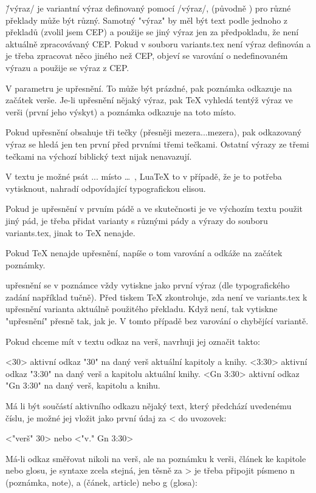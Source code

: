 \v/výraz/ je variantní výraz definovaný pomocí \vdef /výraz/, (původně \vardef)
pro různé překlady může být různý. Samotný "výraz" by měl být text podle
jednoho z překladů (zvolil jsem CEP) a použije se jiný výraz jen za
předpokladu, že není aktuálně zpracovávaný CEP. Pokud v souboru
variants.tex není výraz definován a je třeba zpracovat něco jiného než CEP,
objeví se varování o nedefinovaném výrazu a použije se výraz z CEP.

V parametru \Note je {upřesnění}. To může být prázdné, pak poznámka odkazuje
na začátek verše. Je-li {upřesnění} nějaký výraz, pak TeX vyhledá tentýž
výraz ve verši (první jeho výskyt) a poznámka odkazuje na toto místo.

Pokud {upřesnění} obsahuje tři tečky (přesněji mezera...mezera), pak odkazovaný
výraz se hledá jen ten první před prvními třemi tečkami. Ostatní výrazy ze
třemi tečkami na výchozí biblický text nijak nenavazují.

V textu je možné psát ... místo \dots\ , LuaTeX to v případě, že je to
potřeba vytisknout, nahradí odpovídající typografickou elisou.

Pokud je {upřesnění} v prvním pádě a ve skutečnosti je ve výchozím textu
použit jiný pád, je třeba přidat varianty s různými pády a výrazy do
souboru variants.tex, jinak to TeX nenajde.

Pokud TeX nenajde {upřesnění}, napíše o tom varování a odkáže na začátek
poznámky.

{upřesnění} se v poznámce vždy vytiskne jako první výraz (dle typografického
zadání například tučně). Před tiskem TeX zkontroluje, zda není ve variants.tex 
k {upřesnění} varianta aktuálně použitého překladu. Když není, tak vytiskne 
"upřesnění" přesně tak, jak je. V tomto případě bez varování o chybějící
variantě.

Pokud chceme mít v textu odkaz na verš, navrhuji jej označit takto:

<30> aktivní odkaz "30" na daný verš aktuální kapitoly a knihy.
<3:30> aktivní odkaz "3:30" na daný verš a kapitolu aktuální knihy.
<Gn 3:30> aktivní odkaz "Gn 3:30" na daný verš, kapitolu a knihu.

Má li být součástí aktivního odkazu nějaký text, který předchází 
uvedenému číslu, je možné jej vložit jako první údaj za < do uvozovek:

<"verš" 30> nebo <"v." Gn 3:30>

Má-li odkaz směřovat nikoli na verš, ale na poznámku k verši, článek ke
kapitole nebo glosu, je syntaxe zcela stejná, jen těsně za > je třeba
připojit písmeno n (poznámka, note), a (čánek, article) nebo g (glosa):


